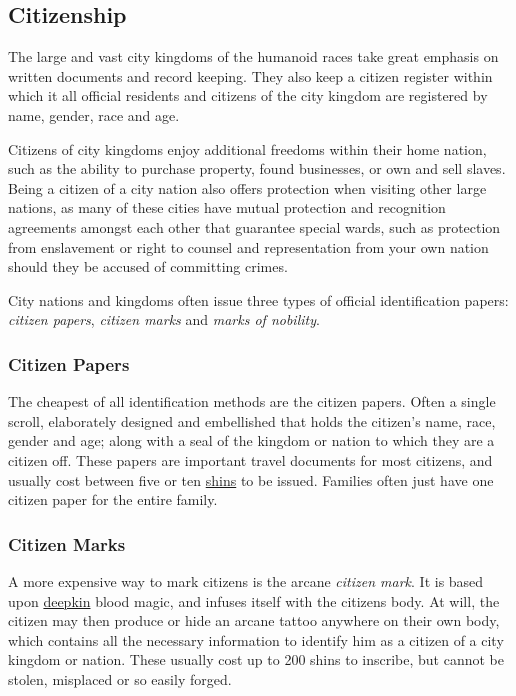 \subsection{Citizenship}
\label{sec:Citizenship}

The large and vast city kingdoms of the humanoid races take great emphasis
on written documents and record keeping. They also keep a citizen register
within which it all official residents and citizens of the city kingdom are
registered by name, gender, race and age.

Citizens of city kingdoms enjoy additional freedoms within their home nation,
such as the ability to purchase property, found businesses, or own and sell
slaves. Being a citizen of a city nation also offers protection when visiting
other large nations, as many of these cities have mutual protection and
recognition agreements amongst each other that guarantee special wards, such
as protection from enslavement or right to counsel and representation from your
own nation should they be accused of committing crimes.

City nations and kingdoms often issue three types of official identification
papers: \emph{citizen papers}, \emph{citizen marks} and
\emph{marks of nobility}.

\subsubsection{Citizen Papers}
\label{sec:Citizen Paper}

The cheapest of all identification methods are the citizen papers. Often a
single scroll, elaborately designed and embellished that holds the citizen's
name, race, gender and age; along with a seal of the kingdom or nation to
which they are a citizen off. These papers are important travel documents for
most citizens, and usually cost between five or ten \hyperref[sec:Shin]{shins}
to be issued. Families often just have one citizen paper for the entire family.

\subsubsection{Citizen Marks}
\label{sec:Citizen Mark}

A more expensive way to mark citizens is the arcane \emph{citizen mark}. It is
based upon \hyperref[sec:Deepkin]{deepkin} blood magic, and infuses itself
with the citizens body. At will, the citizen may then produce or hide an
arcane tattoo anywhere on their own body, which contains all the necessary
information to identify him as a citizen of a city kingdom or nation. These
usually cost up to 200 shins to inscribe, but cannot be stolen, misplaced or
so easily forged.

